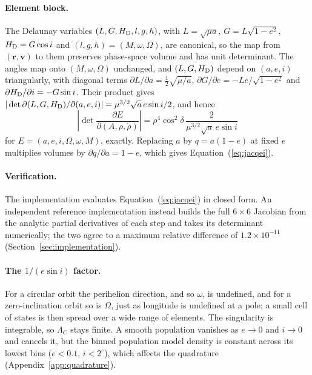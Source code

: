 \documentclass[linenumbers,twocolumn]{aastex701}
\begin{document}
\paragraph{Element block.}
The Delaunay variables $(L,G,H_{\rm D},l,g,h)$, with $L=\sqrt{\mu a}$,
$G=L\sqrt{1-e^2}$, $H_{\rm D}=G\cos i$ and $(l,g,h)=(M,\omega,\Omega)$, are
canonical, so the map from $(\mathbf{r},\mathbf{v})$ to them preserves
phase-space volume and has unit determinant. The angles map onto
$(M,\omega,\Omega)$ unchanged, and $(L,G,H_{\rm D})$ depend on $(a,e,i)$
triangularly, with diagonal terms $\partial L/\partial a=\tfrac12\sqrt{\mu/a}$,
$\partial G/\partial e=-Le/\sqrt{1-e^2}$ and
$\partial H_{\rm D}/\partial i=-G\sin i$. Their product gives
$|\det\partial(L,G,H_{\rm D})/\partial(a,e,i)|=\mu^{3/2}\sqrt{a}\,e\sin i/2$,
and hence
\begin{equation}
\left|\det\frac{\partial E}{\partial(A,\rho,\dot\rho)}\right|
= \rho^4\cos^2\delta\,\frac{2}{\mu^{3/2}\sqrt{a}\,e\sin i}
\label{eq:delaunay}
\end{equation}
for $E=(a,e,i,\Omega,\omega,M)$, exactly. Replacing $a$ by $q=a(1-e)$ at fixed
$e$ multiplies volumes by $\partial q/\partial a=1-e$, which gives
Equation~(\ref{eq:jacqei}).

\paragraph{Verification.}
The implementation evaluates Equation~(\ref{eq:jacqei}) in closed form. An
independent reference implementation instead builds the full $6\times6$
Jacobian from the analytic partial derivatives of each step and takes its
determinant numerically; the two agree to a maximum relative difference of
$1.2\times10^{-11}$ (Section~\ref{sec:implementation}).

\paragraph{The $1/(e\sin i)$ factor.}
For a circular orbit the perihelion direction, and so $\omega$, is
undefined, and for a zero-inclination orbit so is $\Omega$, just as longitude
is undefined at a pole; a small cell of states is then spread over a wide
range of elements. The singularity is integrable, so $\Lambda_C$ stays
finite. A smooth population vanishes as $e\to0$ and $i\to0$ and cancels it,
but the binned population model density is constant across its lowest bins
($e<0.1$, $i<2^\circ$), which affects the quadrature
(Appendix~\ref{app:quadrature}).
\end{document}
